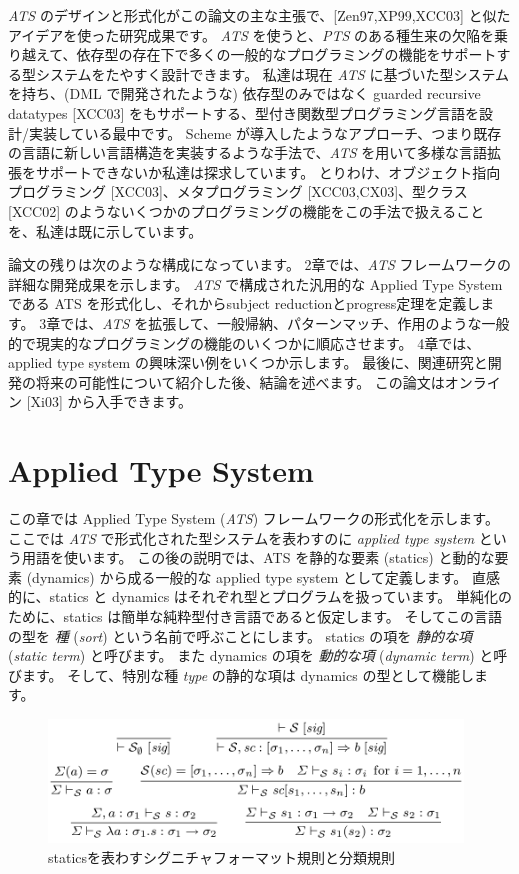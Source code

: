 \documentclass[submit,techreq,noauthor,onecolumn]{ipsj}
\begin{document}
{\it ATS} のデザインと形式化がこの論文の主な主張で、[Zen97,XP99,XCC03] と似たアイデアを使った研究成果です。
{\it ATS} を使うと、{\it PTS} のある種生来の欠陥を乗り越えて、依存型の存在下で多くの一般的なプログラミングの機能をサポートする型システムをたやすく設計できます。
私達は現在 {\it ATS} に基づいた型システムを持ち、(DML で開発されたような) 依存型のみではなく guarded recursive datatypes [XCC03] をもサポートする、型付き関数型プログラミング言語を設計/実装している最中です。
Scheme が導入したようなアプローチ、つまり既存の言語に新しい言語構造を実装するような手法で、{\it ATS} を用いて多様な言語拡張をサポートできないか私達は探求しています。
とりわけ、オブジェクト指向プログラミング [XCC03]、メタプログラミング [XCC03,CX03]、型クラス [XCC02] のようないくつかのプログラミングの機能をこの手法で扱えることを、私達は既に示しています。

論文の残りは次のような構成になっています。
2章では、{\it ATS} フレームワークの詳細な開発成果を示します。
{\it ATS} で構成された汎用的な Applied Type System である ATS を形式化し、それからsubject reductionとprogress定理を定義します。
3章では、{\it ATS} を拡張して、一般帰納、パターンマッチ、作用のような一般的で現実的なプログラミングの機能のいくつかに順応させます。
4章では、applied type system の興味深い例をいくつか示します。
最後に、関連研究と開発の将来の可能性について紹介した後、結論を述べます。
この論文はオンライン [Xi03] から入手できます。

\section{Applied Type System}

この章では Applied Type System ({\it ATS}) フレームワークの形式化を示します。
ここでは {\it ATS} で形式化された型システムを表わすのに {\it applied type system} という用語を使います。
この後の説明では、ATS を静的な要素 (statics) と動的な要素 (dynamics) から成る一般的な applied type system として定義します。
直感的に、statics と dynamics はそれぞれ型とプログラムを扱っています。
単純化のために、statics は簡単な純粋型付き言語であると仮定します。
そしてこの言語の型を {\it 種} ({\it sort}) という名前で呼ぶことにします。
statics の項を {\it 静的な項} ({\it static term}) と呼びます。
また dynamics の項を {\it 動的な項} ({\it dynamic term}) と呼びます。
そして、特別な種 {\it type} の静的な項は dynamics の型として機能します。

\begin{figure}[h]
\centering
\includegraphics[width=11cm]{img/fig1_rules.png}
\caption{staticsを表わすシグニチャフォーマット規則と分類規則}
\label{fig:fig1_rules}
\end{figure}
\end{document}
